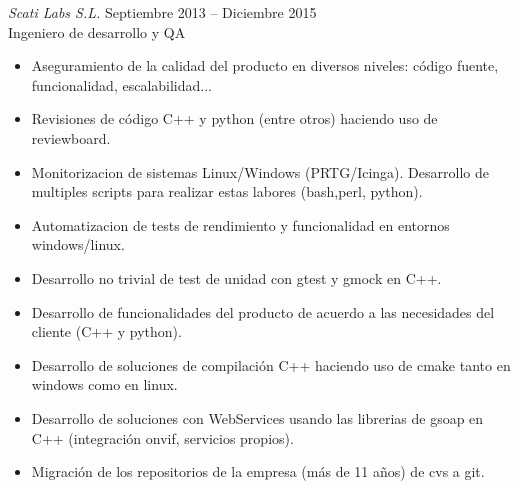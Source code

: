 \documentclass[10pt]{res} %
\begin{document}
\begin{resume}
{\sl Scati Labs S.L.} \hfill Septiembre 2013 -- Diciembre 2015\\
\hfill Ingeniero de desarrollo y QA
\begin{itemize} \itemsep -2pt %
\item Aseguramiento de la calidad del producto en diversos niveles: código fuente, funcionalidad, escalabilidad...
\item Revisiones de código C++ y python (entre otros) haciendo uso de reviewboard.
\item Monitorizacion de sistemas Linux/Windows (PRTG/Icinga). Desarrollo de multiples scripts para realizar estas labores (bash,perl, python).
\item Automatizacion de tests de rendimiento y funcionalidad en entornos windows/linux.
\item Desarrollo no trivial de test de unidad con gtest y gmock en C++.
\item Desarrollo de funcionalidades del producto de acuerdo a las necesidades del cliente (C++ y python). 					
\item Desarrollo de soluciones de compilación C++ haciendo uso de cmake tanto en windows como en linux.
\item Desarrollo de soluciones con WebServices usando las librerias de gsoap en C++ (integración onvif, servicios propios).
\item Migración de los repositorios de la empresa (más de 11 años) de cvs a git.
\end{itemize}


\end{resume}
\end{document}
